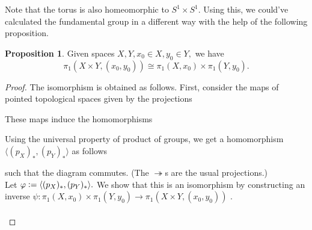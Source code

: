 \documentclass[12pt]{article}
\theoremstyle{definition}
\numberwithin{thm}{section}
\newtheorem{prop}[thm]{Proposition}
\begin{document}
Note that the torus is also homeomorphic to $S^1 \times S^1.$ Using this, we could've calculated the fundamental group in a different way with the help of the following proposition.
\begin{prop}
	Given spaces $X, Y, x_0 \in X, y_0 \in Y,$ we have
	\begin{equation*} 
		\pi_1(X \times Y, (x_0, y_0)) \cong \pi_1(X, x_0) \times \pi_1(Y, y_0).
	\end{equation*}
\end{prop}
\begin{proof} 
	The isomorphism is obtained as follows. First, consider the maps of pointed topological spaces given by the projections
	\begin{center}
	\end{center}
	These maps induce the homomorphisms
	\begin{center}
	\end{center}
	Using the universal property of product of groups, we get a homomorphism $\langle (p_X)_*, (p_Y)_*\rangle$ as follows
	\begin{center}
	\end{center}
	such that the diagram commutes. (The $\twoheadrightarrow$s are the usual projections.)\\
	Let $\varphi \vcentcolon= \langle (p_X)_*, (p_Y)_*\rangle.$ We show that this is an isomorphism by constructing an inverse $\psi:\pi_1(X, x_0) \times \pi_1(Y, y_0) \to \pi_1(X \times Y, (x_0, y_0))$ .\\~\\

\end{proof}
\end{document}
